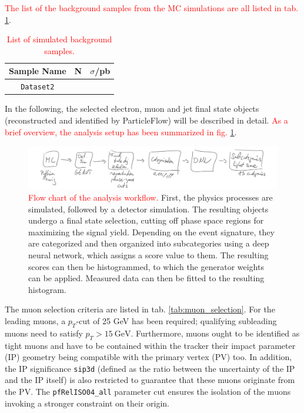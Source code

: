 \textcolor{red}{The list of the background samples from the MC simulations are all listed in tab. \ref{tab:bkg_datasets}}.

\begin{table}[h!]
	\centering
	\begin{tabular}{ccc}
		Sample Name & N & $\sigma$/pb \\
		\hline
		\texttt{Dataset2} & & \\
	\end{tabular}
	\caption{\textcolor{red}{List of simulated background samples.}}
	\label{tab:bkg_datasets}
\end{table}


In the following, the selected electron, muon and jet final state objects (reconstructed and identified by ParticleFlow) will be described in detail. \textcolor{red}{As a brief overview, the analysis setup has been summarized in fig. \ref{fig:analysis_workflow}}.\\

\begin{figure}[h!]
	\centering
	\includegraphics[width=\linewidth]{figures/analysis/classification.pdf}
	\caption{\textcolor{red}{Flow chart of the analysis workflow.} First, the physics processes are simulated, followed by a detector simulation. The resulting objects undergo a final state selection, cutting off phase space regions for maximizing the signal yield. Depending on the event signature, they are categorized and then organized into subcategories using a deep neural network, which assigns a score value to them. The resulting scores can then be histogrammed, to which the generator weights can be applied. Measured data can then be fitted to the resulting histogram.}
	\label{fig:analysis_workflow}
\end{figure}

The muon selection criteria are listed in tab. \ref{tab:muon_selection}. For the leading muons, a $p_T$-cut of 25 GeV has been required; qualifying subleading muons need to satisfy $p_T>\SI{15}{\giga\electronvolt}$. Furthermore, muons ought to be identified as tight muons and have to be contained within the tracker their impact parameter (IP) geometry being compatible with the primary vertex (PV) too. In addition, the IP significance \texttt{sip3d} (defined as the ratio between the uncertainty of the IP and the IP itself) is also restricted to guarantee that these muons originate from the PV. The \texttt{pfRelISO04\_all} parameter cut ensures the isolation of the muons invoking a stronger constraint on their origin.


